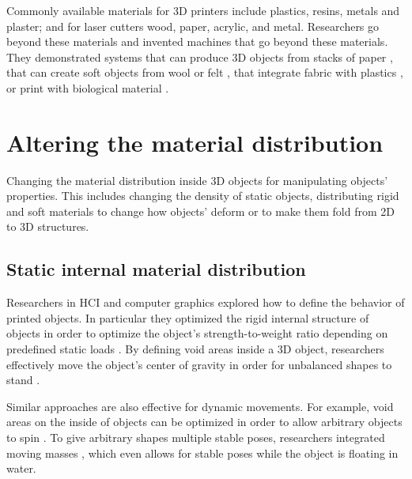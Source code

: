 Commonly available materials for 3D printers include plastics, resins, metals and plaster; and for laser cutters wood, paper, acrylic, and metal. Researchers go beyond these materials and invented machines that go beyond these materials. They demonstrated systems that can produce 3D objects from stacks of paper \cite{Oh2018}, that can create soft objects from wool \cite{Hudson2014} or felt \cite{Peng2015}, that integrate fabric with plastics \cite{Rivera2017, Perez2017}, or print with biological material \cite{Wang2016, Yao2015a}.









\section{Altering the material distribution}

Changing the material distribution inside 3D objects for manipulating objects' properties. This includes changing the density of static objects, distributing rigid and soft materials to change how objects' deform or to make them fold from 2D to 3D structures.

\subsection{Static internal material distribution}
Researchers in HCI and computer graphics explored how to define the behavior of printed objects. In particular they optimized the rigid internal structure of objects in order to optimize the object’s strength-to-weight ratio depending on predefined static loads \cite{Lu2014, Chen2018, Wu2016}. By defining void areas inside a 3D object, researchers effectively move the object’s center of gravity in order for unbalanced shapes to stand \cite{Prevost2013}.

Similar approaches are also effective for dynamic movements. For example, void areas on the inside of objects can be optimized in order to allow arbitrary objects to spin \cite{Bacher2014a}. To give arbitrary shapes multiple stable poses, researchers integrated moving masses \cite{Prevost2016}, which even allows for stable poses while the object is floating in water.


